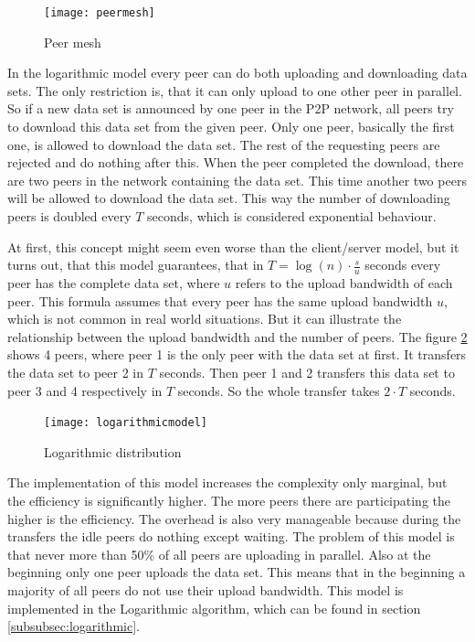 \begin{figure}[H]
\centering
\texttt{[image: peermesh]}
\caption{Peer mesh}
\label{fig:peermesh}
\end{figure}

In the logarithmic model every peer can do both uploading and downloading data sets. The only restriction is, that it can only upload to one other peer in parallel. So if a new data set is announced by one peer in the P2P network, all peers try to download this data set from the given peer. Only one peer, basically the first one, is allowed to download the data set. The rest of the requesting peers are rejected and do nothing after this. When the peer completed the download, there are two peers in the network containing the data set. This time another two peers will be allowed to download the data set. This way the number of downloading peers is doubled every $T$ seconds, which is considered exponential behaviour. 

At first, this concept might seem even worse than the client/server model, but it turns out, that this model guarantees, that in $T=\log{(n)} \cdot \frac{s}{u}$  seconds every peer has the complete data set, where $u$ refers to the upload bandwidth of each peer. This formula assumes that every peer has the same upload bandwidth $u$, which is not common in real world situations. But it can illustrate the relationship between the upload bandwidth and the number of peers. The figure \ref{fig:logarithmicmodel} shows 4 peers, where peer 1 is the only peer with the data set at first. It transfers the data set to peer 2 in $T$ seconds. Then peer 1 and 2 transfers this data set to peer 3 and 4 respectively in $T$ seconds. So the whole transfer takes $2 \cdot T$ seconds.

\begin{figure}[H]
\centering
\texttt{[image: logarithmicmodel]}
\caption{Logarithmic distribution}
\label{fig:logarithmicmodel}
\end{figure}

The implementation of this model increases the complexity only marginal, but the efficiency is significantly higher. The more peers there are participating the higher is the efficiency. The overhead is also very manageable because during the transfers the idle peers do nothing except waiting. The problem of this model is that never more than 50\% of all peers are uploading in parallel. Also at the beginning only one peer uploads the data set. This means that in the beginning a majority of all peers do not use their upload bandwidth. This model is implemented in the Logarithmic algorithm, which can be found in section \ref{subsubsec:logarithmic}.


